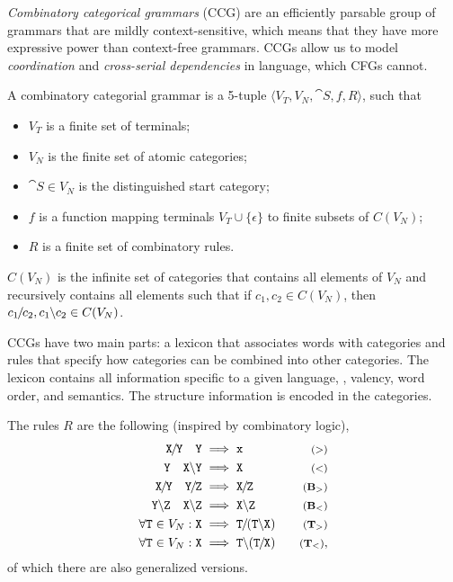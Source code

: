 \textit{Combinatory categorical grammars} (CCG) are an efficiently parsable
group of grammars that are mildly context-sensitive, which means that they have
more expressive power than context-free grammars. CCGs allow us to model
\textit{coordination} and \textit{cross-serial dependencies} in language, which
CFGs cannot.

\begin{definition}
  A combinatory categorial grammar is a 5-tuple $\langle V_T, V_N, \cat{S}, f,
  R\rangle$, such that
  \begin{itemize}
    \item $V_T$ is a finite set of terminals;
    \item $V_N$ is the finite set of atomic categories;
    \item $\cat{S} \in V_N$ is the distinguished start category;
    \item $f$ is a function mapping terminals $V_T \cup \{ \epsilon \}$ to
      finite subsets of $C(V_N)$;
    \item $R$ is a finite set of combinatory rules.
  \end{itemize}

  $C(V_N)$ is the infinite set of categories that contains all elements of $V_N$
  and recursively contains all elements such that if $c_1,c_2\in C(V_N)$, then
  $c_1 \kern-1pt /\kern-1pt c_2, c_1 \kern-.3pt \backslash\kern-.2pt c_2 \in C(V_N)$.
\end{definition}

CCGs have two main parts: a lexicon that associates words with categories and
rules that specify how categories can be combined into other categories. The
lexicon contains all information specific to a given language, \ie, valency,
word order, and semantics. The structure information is encoded in the
categories.

The rules $R$ are the following (inspired by combinatory logic),
\begin{align*}
  \cat{X \fs Y} \hspace{1em} \cat{Y} &\implies \cat{x} & \text{\footnotesize $(>)$} \\
  \cat{Y} \hspace{1em} \cat{X \bs Y} &\implies \cat{X} & \text{\footnotesize $(<)$} \\
  \cat{X \fs Y} \hspace{1em} \cat{Y \fs Z} &\implies \cat{X \fs Z} & \text{\footnotesize $(\mathbf{B}_>)$} \\
  \cat{Y \bs Z} \hspace{1em} \cat{X \bs Z} &\implies \cat{X \bs Z} & \text{\footnotesize $(\mathbf{B}_<)$} \\
  \forall \cat{T}\in V_N : \cat{X} &\implies \cat{T \fs (T \bs X)} & \text{\footnotesize $(\mathbf{T}_>)$} \\
  \forall \cat{T}\in V_N : \cat{X} &\implies \cat{T \bs (T \fs X)} & \text{\footnotesize $(\mathbf{T}_<)$}
,\end{align*}
of which there are also generalized versions.

